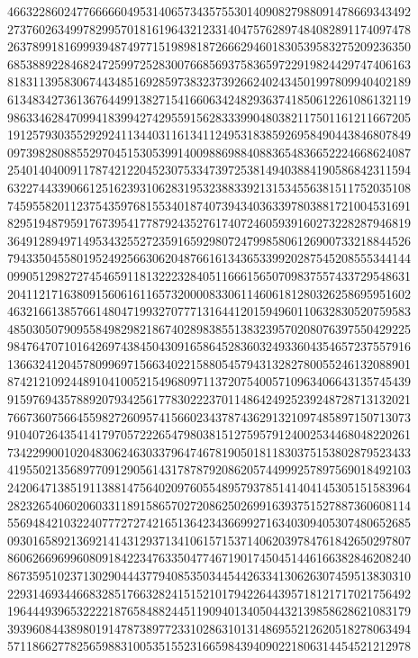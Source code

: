 {{    4663228602477666660495314065734357553014090827988091478669343492 ~
    2737602634997829957018161964321233140475762897484082891174097478 ~
    2637899181699939487497715198981872666294601830539583275209236350 ~
    6853889228468247259972528300766856937583659722919824429747406163 ~
    8183113958306744348516928597383237392662402434501997809940402189 ~
    6134834273613676449913827154166063424829363741850612261086132119 ~
    9863346284709941839942742955915628333990480382117501161211667205 ~
    1912579303552929241134403116134112495318385926958490443846807849 ~
    0973982808855297045153053991400988698840883654836652224668624087 ~
    2540140400911787421220452307533473972538149403884190586842311594 ~
    6322744339066125162393106283195323883392131534556381511752035108 ~
    7459558201123754359768155340187407394340363397803881721004531691 ~
    8295194879591767395417787924352761740724605939160273228287946819 ~
    3649128949714953432552723591659298072479985806126900733218844526 ~
    7943350455801952492566306204876616134365339920287545208555344144 ~
    0990512982727454659118132223284051166615650709837557433729548631 ~
    2041121716380915606161165732000083306114606181280326258695951602 ~
    4632166138576614804719932707771316441201594960110632830520759583 ~
    4850305079095584982982186740289838551383239570208076397550429225 ~
    9847647071016426974384504309165864528360324933604354657237557916 ~
    1366324120457809969715663402215880545794313282780055246132088901 ~
    8742121092448910410052154968097113720754005710963406643135745439 ~
    9159769435788920793425617783022237011486424925239248728713132021 ~
    7667360756645598272609574156602343787436291321097485897150713073 ~
    9104072643541417970572226547980381512759579124002534468048220261 ~
    7342299001020483062463033796474678190501811830375153802879523433 ~
    4195502135689770912905614317878792086205744999257897569018492103 ~
    2420647138519113881475640209760554895793785141404145305151583964 ~
    2823265406020603311891586570272086250269916393751527887360608114 ~
    5569484210322407772727421651364234366992716340309405307480652685 ~
    0930165892136921414312937134106157153714062039784761842650297807 ~
    8606266969960809184223476335047746719017450451446166382846208240 ~
    8673595102371302904443779408535034454426334130626307459513830310 ~
    2293146934466832851766328241515210179422644395718121717021756492 ~
    1964449396532222187658488244511909401340504432139858628621083179 ~
    3939608443898019147873897723310286310131486955212620518278063494 ~
    5711866277825659883100535155231665984394090221806314454521212978 ~
}}
